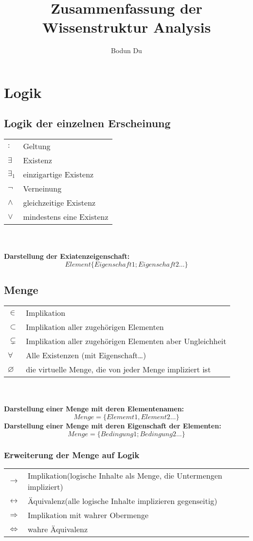 \documentclass{article}
\title{Zusammenfassung der Wissenstruktur Analysis}
\author{Bodun Du}
\begin{document}
    \maketitle
    \pagebreak
    \tableofcontents
    \pagebreak

    \section{Logik}

    \subsection{Logik der einzelnen Erscheinung}
    \begin{tabular}{ll}
        $:$ &Geltung\\
        $\exists$ &Existenz\\
        $\exists_1$ &einzigartige Existenz\\
        $\lnot $ &Verneinung\\
        $\wedge $ &gleichzeitige Existenz\\
        $\vee $ &mindestens eine Existenz\\
    \end{tabular}\\\\
    \textbf{Darstellung der Exiatenzeigenschaft:} $$Element\{Eigenschaft1; Eigenschaft2\dots\}$$
    \subsection{Menge}
    \begin{tabular}{ll}
        $\in $ &Implikation\\
        $\subset$ &Implikation aller zugehörigen Elementen\\
        $\subsetneq$ &Implikation aller zugehörigen Elementen aber Ungleichheit\\
        $\forall $ &Alle Existenzen (mit Eigenschaft\dots)\\
        $\varnothing $ &die virtuelle Menge, die von jeder Menge impliziert ist
    \end{tabular}\\\\
    \textbf{Darstellung einer Menge mit deren Elementenamen:} $$Menge=\{Elememt1, Element2\dots\}$$
    \textbf{Darstellung einer Menge mit deren Eigenschaft der Elementen:} $$Menge=\{Bedingung1; Bedingung2\dots\}$$
    \subsubsection{Erweiterung der Menge auf Logik}
    \begin{tabular}{ll}
        $\rightarrow$ &Implikation(logische Inhalte als Menge, die Untermengen impliziert)\\
        $\leftrightarrow$ &Äquivalenz(alle logische Inhalte implizieren gegenseitig)\\
        $\Rightarrow $ &Implikation mit wahrer Obermenge\\
        $\Leftrightarrow$ &wahre Äquivalenz\\
    \end{tabular}
    
\end{document}
